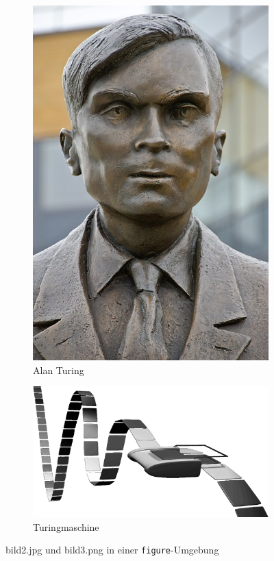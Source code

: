 \documentclass{scrartcl}
\begin{document}
\begin{figure}[H]
\begin{subfigure}{.45\textwidth}
  \centering
  \includegraphics[width=.5\linewidth]{bild2.jpg}
  \caption{Alan Turing}
  \label{fig:alanturing}
\end{subfigure}%
\begin{subfigure}{.45\textwidth}
  \centering
  \includegraphics[width=.5\linewidth]{bild3.png}
  \caption{Turingmaschine}
  \label{fig:turingmaschine}
\end{subfigure}
\label{fig:test}
\caption{bild2.jpg und bild3.png in einer \texttt{figure}-Umgebung}
\end{figure}
\end{document}
